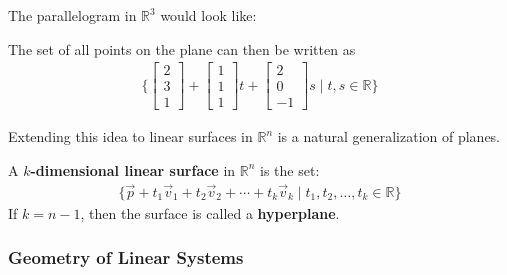 The parallelogram in $\mathbb{R}^3$ would look like:
%

\begin{center}
\end{center}


The set of all points on the plane can then be written as 
%
\begin{align*}
\{ \begin{bmatrix}
2 \\ 3 \\ 1
\end{bmatrix} + \begin{bmatrix}
1 \\ 1 \\ 1
\end{bmatrix} t + 
\begin{bmatrix}
2 \\ 0 \\ -1
\end{bmatrix} s \; | \; t,s \in \mathbb{R} \}
\end{align*}

Extending this idea to linear surfaces in $\mathbb{R}^n$ is a natural generalization of planes.  
\begin{definition}
A \textbf{$k$-dimensional linear surface} in $\mathbb{R}^n$ is the set:
\begin{align*}
\{ \vec{p} + t_1 \vec{v}_1 + t_2 \vec{v}_2 + \cdots + t_k \vec{v}_k \; | \; t_1, t_2, \ldots, t_k \in \mathbb{R} \} 
\end{align*}
If $k=n-1$, then the surface is called a \textbf{hyperplane}.  
\end{definition}



\subsubsection{Geometry of Linear Systems}

